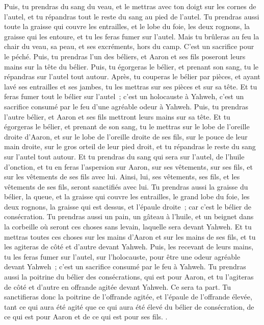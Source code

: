 \begin{multicols}{2}
Puis, tu prendras du sang du veau, et le mettras avec ton doigt sur les cornes de l'autel, et tu répandras tout le reste du sang au pied de l'autel.
Tu prendras aussi toute la graisse qui couvre les entrailles, et le lobe du foie, les deux rognons, la graisse qui les entoure, et tu les feras fumer sur l'autel.
Mais tu brûleras au feu la chair du veau, sa peau, et ses excréments, hors du camp. C'est un sacrifice pour le péché.
Puis, tu prendras l'un des béliers, et Aaron et ses fils poseront leurs mains sur la tête du bélier.
Puis, tu égorgeras le bélier, et prenant son sang, tu le répandras sur l'autel tout autour.
Après, tu couperas le bélier par pièces, et ayant lavé ses entrailles et ses jambes, tu les mettras sur ses pièces et sur sa tête.
 Et tu feras fumer tout le bélier sur l'autel~; c'est un holocauste à Yahweh, c'est un sacrifice consumé par le feu d'une agréable odeur à Yahweh.
Puis, tu prendras l'autre bélier, et Aaron et ses fils mettront leurs mains sur sa tête.
Et tu égorgeras le bélier, et prenant de son sang, tu le mettras sur le lobe de l'oreille droite d'Aaron, et sur le lobe de l'oreille droite de ses fils, sur le pouce de leur main droite, sur le gros orteil de leur pied droit, et tu répandras le reste du sang sur l'autel tout autour.
Et tu prendras du sang qui sera sur l'autel, de l'huile d'onction, et tu en feras l'aspersion sur Aaron, sur ses vêtements, sur ses fils, et sur les vêtements de ses fils avec lui. Ainsi, lui, ses vêtements, ses fils, et les vêtements de ses fils, seront sanctifiés avec lui.
Tu prendras aussi la graisse du bélier, la queue, et la graisse qui couvre les entrailles, le grand lobe du foie, les deux rognons, la graisse qui est dessus, et l'épaule droite~; car c'est le bélier de consécration.
Tu prendras aussi un pain, un gâteau à l'huile, et un beignet dans la corbeille où seront ces choses sans levain, laquelle sera devant Yahweh.
Et tu mettras toutes ces choses sur les mains d'Aaron et sur les mains de ses fils, et tu les agiteras de côté et d'autre devant Yahweh.
Puis, les recevant de leurs mains, tu les feras fumer sur l'autel, sur l'holocauste, pour être une odeur agréable devant Yahweh~; c'est un sacrifice consumé par le feu à Yahweh.
Tu prendras aussi la poitrine du bélier des consécrations, qui est pour Aaron, et tu l'agiteras de côté et d'autre en offrande agitée devant Yahweh. Ce sera ta part.
Tu sanctifieras donc la poitrine de l'offrande agitée, et l'épaule de l'offrande élevée, tant ce qui aura été agité que ce qui aura été élevé du bélier de consécration, de ce qui est pour Aaron et de ce qui est pour ses fils. .

\end{multicols}

